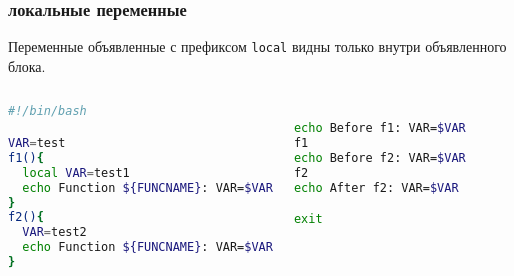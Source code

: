 \begin{frame}[fragile]
	\frametitle{локальные переменные}

	Переменные объявленные с префиксом {\tt local} видны только внутри объявленного блока.

	\small
	\begin{columns}
        \begin{lstlisting}[language=bash,frame=single]
#!/bin/bash

VAR=test
f1(){
  local VAR=test1
  echo Function ${FUNCNAME}: VAR=$VAR
}
f2(){
  VAR=test2
  echo Function ${FUNCNAME}: VAR=$VAR
}
		\end{lstlisting}
        \begin{lstlisting}[language=bash,frame=single]

echo Before f1: VAR=$VAR
f1
echo Before f2: VAR=$VAR
f2
echo After f2: VAR=$VAR

exit
\end{lstlisting}
	\end{columns}

\end{frame}

